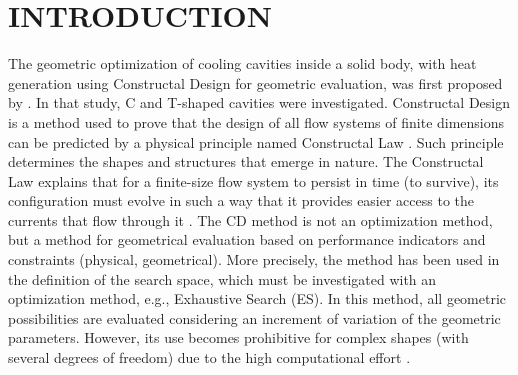 \documentclass[12pt,fleqn]{article}
\begin{document}
\section{INTRODUCTION}
The geometric optimization of cooling cavities inside a solid body, with heat generation using Constructal Design for geometric evaluation, was first proposed by \cite{Biserni2004}. In that study, C and T-shaped cavities were investigated. Constructal Design is a method used to prove that the design of all flow systems of finite dimensions can be predicted by a physical principle named Constructal Law \citep{Bejan}. Such principle determines the shapes and structures that emerge in nature. The Constructal Law explains that for a finite-size flow system to persist in time (to survive), its configuration must evolve in such a way that it provides easier access to the currents that flow through it \citep{Bejan}. The CD method is not an optimization method, but a method for geometrical evaluation based on performance indicators and constraints (physical, geometrical). More precisely, the method has been used in the definition of the search space, which must be investigated with an optimization method, e.g., Exhaustive Search (ES).  In this method, all geometric possibilities are evaluated considering an increment of variation of the geometric parameters. However, its use becomes prohibitive for complex shapes (with several degrees of freedom) due to the high computational effort \citep{Gonzales2015a}.
\end{document}

